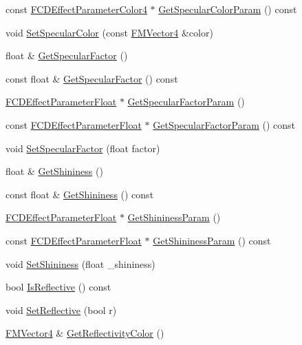 \begin{DoxyCompactItemize}
\item 
const \hyperlink{classFCDEffectParameterAnimatableT}{FCDEffectParameterColor4} $\ast$ \hyperlink{classFCDEffectStandard_a96a3021ea4315499f01b1ab5cefab2a4}{GetSpecularColorParam} () const 
\item 
void \hyperlink{classFCDEffectStandard_a01e8df7c03a4ee76e929d3e2f71aaff8}{SetSpecularColor} (const \hyperlink{classFMVector4}{FMVector4} \&color)
\item 
float \& \hyperlink{classFCDEffectStandard_ac83628e3ccf1c9215249fa4dbe1b9919}{GetSpecularFactor} ()
\item 
const float \& \hyperlink{classFCDEffectStandard_a06692330309f95f57281301feb05eedc}{GetSpecularFactor} () const 
\item 
\hyperlink{classFCDEffectParameterAnimatableT}{FCDEffectParameterFloat} $\ast$ \hyperlink{classFCDEffectStandard_a0d9fde6e676a6dafa1951043e0185ed3}{GetSpecularFactorParam} ()
\item 
const \hyperlink{classFCDEffectParameterAnimatableT}{FCDEffectParameterFloat} $\ast$ \hyperlink{classFCDEffectStandard_ac876d1261703bcdab860ee03288c8ac4}{GetSpecularFactorParam} () const 
\item 
void \hyperlink{classFCDEffectStandard_a4511986a5a68aeb47ce042c722bf8071}{SetSpecularFactor} (float factor)
\item 
float \& \hyperlink{classFCDEffectStandard_ab4654ab8fa86532fe336804f067b58a2}{GetShininess} ()
\item 
const float \& \hyperlink{classFCDEffectStandard_a07d5518f90b17601f0d729885956a56a}{GetShininess} () const 
\item 
\hyperlink{classFCDEffectParameterAnimatableT}{FCDEffectParameterFloat} $\ast$ \hyperlink{classFCDEffectStandard_a845897c93a379357f9e46224dae9e2ad}{GetShininessParam} ()
\item 
const \hyperlink{classFCDEffectParameterAnimatableT}{FCDEffectParameterFloat} $\ast$ \hyperlink{classFCDEffectStandard_a628bb62efa7a89d2d99212961103fe85}{GetShininessParam} () const 
\item 
void \hyperlink{classFCDEffectStandard_a992804e1672eefab311332f23679fb80}{SetShininess} (float \_\-shininess)
\item 
bool \hyperlink{classFCDEffectStandard_a68040795f35f89bf38331e86ba853449}{IsReflective} () const 
\item 
void \hyperlink{classFCDEffectStandard_a6fdc49307f092d5b20eb66daa48e1920}{SetReflective} (bool r)
\item 
\hyperlink{classFMVector4}{FMVector4} \& \hyperlink{classFCDEffectStandard_aa8983e27afa9a215fbb33e8edb63444d}{GetReflectivityColor} ()

\end{DoxyCompactItemize}
